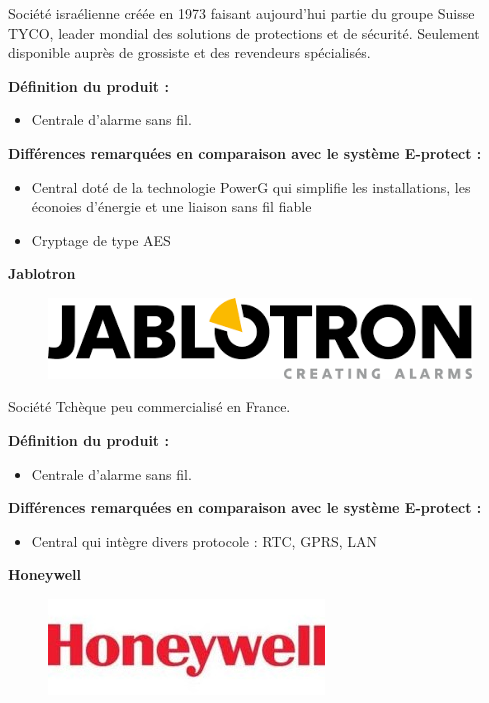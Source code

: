 Société israélienne créée en 1973 faisant aujourd'hui partie du groupe Suisse TYCO, leader mondial des solutions de protections et de sécurité. Seulement disponible auprès de grossiste et des revendeurs spécialisés.

\textbf{Définition du produit :}
\begin{itemize}
\item Centrale d'alarme sans fil.
\end{itemize}

\textbf{Différences remarquées en comparaison avec le système E-protect :}
\begin{itemize}
\item Central doté de la technologie PowerG qui simplifie les installations, les éconoies d'énergie et une liaison sans fil fiable 
\item Cryptage de type AES\\
\end{itemize}

\textbf{Jablotron}\\
\begin{figure}[h!]
	\begin{center}
		\includegraphics[width=0.4\linewidth]{../images/jablotron}
	\end{center}
	\caption{\cite{www:jablotron}}
\end{figure}

Société Tchèque peu commercialisé en France.

\textbf{Définition du produit :}
\begin{itemize}
\item Centrale d'alarme sans fil.
\end{itemize}

\textbf{Différences remarquées en comparaison avec le système E-protect :}
\begin{itemize}
\item Central qui intègre divers protocole : RTC, GPRS, LAN\\
\end{itemize}

\textbf{Honeywell}\\
\begin{figure}[h!]
	\begin{center}
		\includegraphics[width=0.4\linewidth]{../images/honeywell}
	\end{center}
	\caption{\cite{www:honeywell}}
\end{figure}

